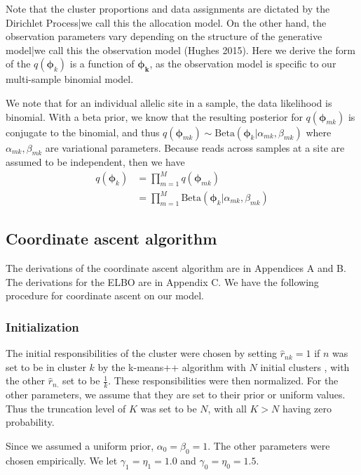 \documentclass[11pt]{article}
\begin{document}
Note that the cluster proportions and data assignments are dictated by the Dirichlet Process|we call this the allocation model. On the other hand, the observation parameters vary depending on the structure of the generative model|we call this the observation model (Hughes 2015). Here we derive the form of the  $q(\bm{\phi}_k)$ is a function of $\bm{\phi_k}$, as the observation model is specific to our multi-sample binomial model.

We note that for an individual allelic site in a sample, the data likelihood is binomial. With a beta prior, we know that the resulting posterior for $q(\bm{\phi}_{mk})$ is conjugate to the binomial, and thus $q(\bm{\phi}_{mk}) \sim \mathrm{Beta}(\bm{\phi}_k | \alpha_{mk}, \beta_{mk})$ where $\alpha_{mk}, \beta_{mk}$ are variational parameters. Because reads across samples at a site are assumed to be independent, then we have 
\begin{align*}
q(\bm{\phi}_k)  &= \prod\limits_{m=1}^M q(\bm{\phi}_{mk}) \\
				&= \prod\limits_{m=1}^M \mathrm{Beta}(\bm{\phi}_k | \alpha_{mk}, \beta_{mk})
\end{align*}

\subsection{Coordinate ascent algorithm}

The derivations of the coordinate ascent algorithm are in Appendices A and B. The derivations for the ELBO are in Appendix C. We have the following procedure for coordinate ascent on our model.

\subsubsection{Initialization}
The initial responsibilities of the cluster were chosen by setting $\hat{r}_{nk} = 1$ if $n$ was set to be in cluster $k$ by the k-means++ algorithm with $N$ initial clusters \cite{Hughes2015}, with the other $\hat{r}_{n.}$ set to be $\frac{1}{k}$. These responsibilities were then normalized. For the other parameters, we assume that they are set to their prior or uniform values. Thus the truncation level of $K$ was set to be $N$, with all $K > N$ having zero probability.

Since we assumed a uniform prior, $\alpha_0 = \beta_0 = 1$. The other parameters were chosen empirically. We let $\gamma_1 = \eta_1 = 1.0$ and $\gamma_0 = \eta_0 = 1.5$.
\end{document}

